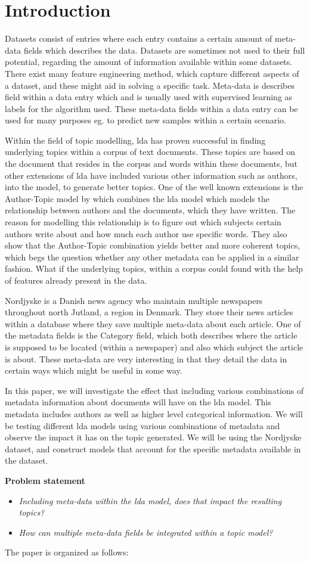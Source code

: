 \section{Introduction}\label{sec:introduction}
Datasets consist of entries where each entry contains a certain amount of meta-data fields which describes the data.
Datasets are sometimes not used to their full potential, regarding the amount of information available within some datasets.
There exist many feature engineering method, which capture different aspects of a dataset, and these might aid in solving a specific task.
Meta-data is describes field within a data entry which and is usually used with supervised learning as labels for the algorithm used.
These meta-data fields within a data entry can be used for many purposes eg. to predict new samples within a certain scenario.

Within the field of topic modelling, \Gls{lda} has proven successful in finding underlying topics within a corpus of text documents.
These topics are based on the document that resides in the corpus and words within these documents, but other extensions of \gls{lda} have included various other information such as authors, into the model, to generate better topics.
One of the well known extensions is the Author-Topic model by \citet{author_topic} which combines the \gls{lda} model which models the relationship between authors and the documents, which they have written.
The reason for modelling this relationship is to figure out which subjects certain authors write about and how much each author use specific words. 
They also show that the Author-Topic combination yields better and more coherent topics, which begs the question whether any other metadata can be applied in a similar fashion.
What if the underlying topics, within a corpus could found with the help of features already present in the data.

Nordjyske is a Danish news agency who maintain multiple newspapers throughout north Jutland, a region in Denmark.
They store their news articles within a database where they save multiple meta-data about each article.
One of the metadata fields is the Category field, which both describes where the article is supposed to be located (within a newspaper) and also which subject the article is about.
These meta-data are very interesting in that they detail the data in certain ways which might be useful in some way.

In this paper, we will investigate the effect that including various combinations of metadata information about documents will have on the \gls{lda} model.
This metadata includes authors as well as higher level categorical information.
We will be testing different \gls{lda} models using various combinations of metadata and observe the impact it has on the topic generated.
We will be using the Nordjyske dataset, and construct models that account for the specific metadata available in the dataset.

\textbf{Problem statement}
\begin{itemize}
	\item \textit{Including meta-data within the \gls{lda} model, does that impact the resulting topics?}
	\item \textit{How can multiple meta-data fields be integrated within a topic model?}
\end{itemize}
	
The paper is organized as follows: 
